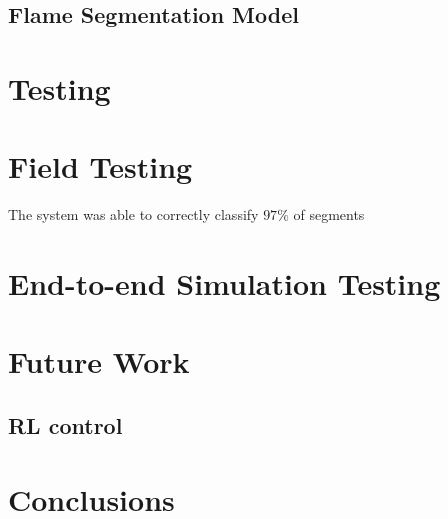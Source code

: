   \subsection{Flame Segmentation Model}

\section{Testing}

  \section{Field Testing}

  The system was able to correctly classify $97\%$ of segments

  \section{End-to-end Simulation Testing}

\section{Future Work}\label{sec:future_work}

  \subsection{RL control}

\section{Conclusions}\label{sec:conclusions}


